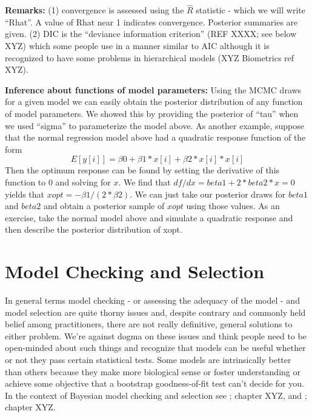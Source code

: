 {\bf Remarks:} (1) convergence is assessed using the $\hat{R}$ statistic - which we will write ``Rhat''. A value of Rhat near 1 indicates convergence. Posterior summaries are given.  (2) DIC is the ``deviance information criterion'' (REF XXXX; see below XYZ) which some people use in a manner similar to AIC although it is recognized to have some problems in hierarchical models (XYZ Biometrics ref XYZ).  

{\bf Inference about functions of model parameters:}  Using the MCMC draws for a given model we can easily obtain the posterior distribution of any function of model parameters.  We showed this by providing the posterior of ``tau'' when we used ``sigma'' to parameterize the model above.  As another example, suppose that the normal regression model above had a quadratic response function of the form
\[
	E[y[i]] = \beta0 + \beta1*x[i] + \beta2*x[i]*x[i]
\]
Then the optimum response can be found by setting the derivative of this function to 0 and solving for $x$. We find that $df/dx = beta1 + 2*beta2*x = 0$ yields that $xopt = -\beta1/(2*\beta2)$.   We can just take our posterior draws for $beta1$ and $beta2$ and obtain a posterior sample of $xopt$ using those values. As an exercise, take the normal model above and simulate a quadratic response and then describe the posterior distribution of xopt. 



\section{Model Checking and Selection}

In general terms model checking - or assessing the adequacy of the
model - and model selection are quite thorny issues and, despite
contrary and commonly held belief among practitioners, there are not
really definitive, general solutions to either problem. We're against
dogma on these issues and think people need to be open-minded about
such things and recognize that models can be useful whether or not
they pass certain statistical tests. Some models are intrinsically
better than others because they make more biological sense or foster
understanding or achieve some objective that a bootstrap
goodness-of-fit test can't decide for you.  In the context of Bayesian
model checking and selection see \citet{kery:2010}; chapter XYZ, and \citet{link_barker:2009}; chapter XYZ. 

